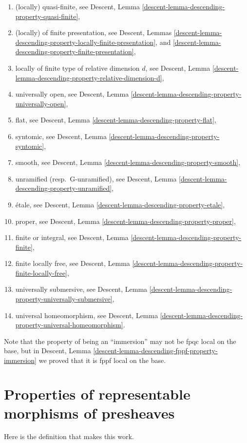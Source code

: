 \begin{remark}
\begin{enumerate}
\item (locally) quasi-finite, see
Descent, Lemma \ref{descent-lemma-descending-property-quasi-finite},
\item (locally) of finite presentation, see
Descent, Lemmas
\ref{descent-lemma-descending-property-locally-finite-presentation}, and
\ref{descent-lemma-descending-property-finite-presentation},
\item locally of finite type of relative dimension $d$, see
Descent,
Lemma \ref{descent-lemma-descending-property-relative-dimension-d},
\item universally open, see
Descent, Lemma \ref{descent-lemma-descending-property-universally-open},
\item flat, see
Descent, Lemma \ref{descent-lemma-descending-property-flat},
\item syntomic, see
Descent, Lemma \ref{descent-lemma-descending-property-syntomic},
\item smooth, see
Descent, Lemma \ref{descent-lemma-descending-property-smooth},
\item unramified (resp.\ G-unramified), see
Descent, Lemma \ref{descent-lemma-descending-property-unramified},
\item \'etale, see
Descent, Lemma \ref{descent-lemma-descending-property-etale},
\item proper, see
Descent, Lemma \ref{descent-lemma-descending-property-proper},
\item finite or integral, see
Descent, Lemma \ref{descent-lemma-descending-property-finite},
\item finite locally free, see
Descent, Lemma \ref{descent-lemma-descending-property-finite-locally-free},
\item universally submersive, see
Descent, Lemma \ref{descent-lemma-descending-property-universally-submersive},
\item universal homeomorphism, see
Descent, Lemma \ref{descent-lemma-descending-property-universal-homeomorphism}.
\end{enumerate}
Note that the property of being an ``immersion'' may not be fpqc local
on the base, but in
Descent, Lemma \ref{descent-lemma-descending-fppf-property-immersion}
we proved that it is fppf local on the base.
\end{remark}

\section{Properties of representable morphisms of presheaves}
\label{spaces-section-representable-properties}
Here is the definition that makes this work.

